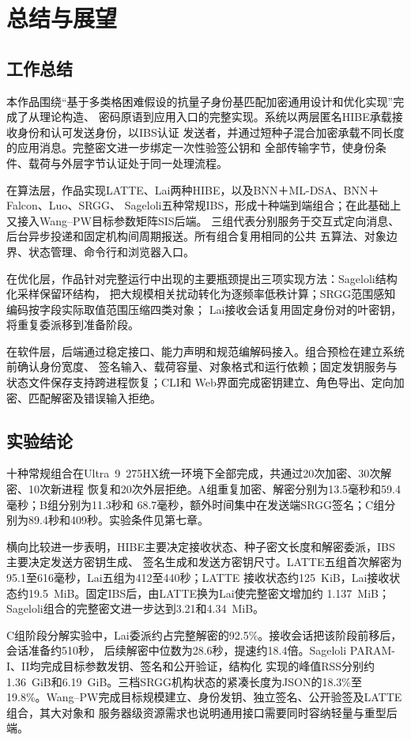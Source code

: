 \chapter{总结与展望}

\section{工作总结}

本作品围绕“基于多类格困难假设的抗量子身份基匹配加密通用设计和优化实现”完成了从理论构造、
密码原语到应用入口的完整实现。系统以两层匿名HIBE承载接收身份和认可发送身份，以IBS认证
发送者，并通过短种子混合加密承载不同长度的应用消息。完整密文进一步绑定一次性验签公钥和
全部传输字节，使身份条件、载荷与外层字节认证处于同一处理流程。

在算法层，作品实现LATTE、Lai两种HIBE，以及BNN＋ML-DSA、BNN＋Falcon、Luo、SRGG、
Sageloli五种常规IBS，形成十种端到端组合；在此基础上又接入Wang--PW目标参数矩阵SIS后端。
三组代表分别服务于交互式定向消息、后台异步投递和固定机构间周期报送。所有组合复用相同的公共
五算法、对象边界、状态管理、命令行和浏览器入口。

在优化层，作品针对完整运行中出现的主要瓶颈提出三项实现方法：Sageloli结构化采样保留环结构，
把大规模相关扰动转化为逐频率低秩计算；SRGG范围感知编码按字段实际取值范围压缩四类对象；
Lai接收会话复用固定身份对的叶密钥，将重复委派移到准备阶段。

在软件层，后端通过稳定接口、能力声明和规范编解码接入。组合预检在建立系统前确认身份宽度、
签名输入、载荷容量、对象格式和运行依赖；固定发钥服务与状态文件保存支持跨进程恢复；CLI和
Web界面完成密钥建立、角色导出、定向加密、匹配解密及错误输入拒绝。

\section{实验结论}

十种常规组合在Ultra~9~275HX统一环境下全部完成，共通过20次加密、30次解密、10次新进程
恢复和20次外层拒绝。A组重复加密、解密分别为13.5毫秒和59.4毫秒；B组分别为11.3秒和
68.7毫秒，额外时间集中在发送端SRGG签名；C组分别为89.4秒和409秒。实验条件见第七章。

横向比较进一步表明，HIBE主要决定接收状态、种子密文长度和解密委派，IBS主要决定发送方密钥生成、
签名生成和发送方密钥尺寸。LATTE五组首次解密为95.1至616毫秒，Lai五组为412至440秒；LATTE
接收状态约125~KiB，Lai接收状态约19.5~MiB。固定IBS后，由LATTE换为Lai使完整密文增加约
1.137~MiB；Sageloli组合的完整密文进一步达到3.21和4.34~MiB。

C组阶段分解实验中，Lai委派约占完整解密的92.5\%。接收会话把该阶段前移后，会话准备约510秒，
后续解密中位数为28.6秒，提速约18.4倍。Sageloli PARAM-I、II均完成目标参数发钥、签名和公开验证，结构化
实现的峰值RSS分别约1.36~GiB和6.19~GiB。三档SRGG机构状态的紧凑长度为JSON的18.3\%至
19.8\%。Wang--PW完成目标规模建立、身份发钥、独立签名、公开验签及LATTE组合，其大对象和
服务器级资源需求也说明通用接口需要同时容纳轻量与重型后端。

